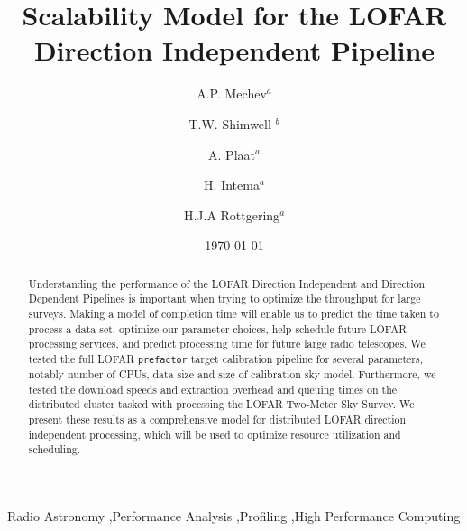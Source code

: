 \documentclass[preprint,5p]{elsarticle}
\begin{document}
\sloppy
{}
\begin{frontmatter}


\title{Scalability Model for the LOFAR Direction Independent Pipeline}%
\author{A.P. Mechev$^a$}

\author{T.W. Shimwell $^b$}%
\author{A. Plaat$^a$}%
\author{H. Intema$^a$}%
\author{H.J.A Rottgering$^a$}%

\date{\today}%
\address{$^a$ Leiden University}
\address{$^b$ ASTRON }
\address{$^c$ Affiliation Address 3}

\begin{abstract}
Understanding the performance of the LOFAR Direction Independent and Direction Dependent Pipelines is important when trying to optimize the throughput for large surveys. Making a model of completion time will enable us to predict the time taken to process a data set, optimize our parameter choices, help schedule future LOFAR processing services, and predict processing time for future large radio telescopes. We tested the full LOFAR \texttt{prefactor} target calibration pipeline for several parameters, notably number of CPUs, data size and size of calibration sky model. Furthermore, we tested the download speeds and extraction overhead and queuing times on the distributed cluster tasked with processing the LOFAR Two-Meter Sky Survey. We present these results as a comprehensive model for distributed LOFAR direction independent processing, which will be used to optimize resource utilization and scheduling. 

\end{abstract}
\begin{keyword}
Radio Astronomy \sep Performance Analysis \sep Profiling \sep High Performance Computing


\end{keyword}
\end{frontmatter}
\end{document}

